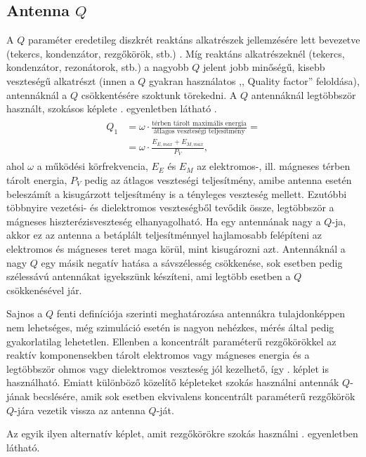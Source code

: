 		\subsection{Antenna $Q$}
		A $Q$ paraméter eredetileg diszkrét reaktáns alkatrészek jellemzésére lett bevezetve (tekercs, kondenzátor, rezgőkörök, stb.) \cite{story-of-q}. Míg reaktáns alkatrészeknél (tekercs, kondenzátor, rezonátorok, stb.) a nagyobb $Q$ jelent jobb minőségű, kisebb veszteségű alkatrészt (innen a $Q$ gyakran használatos ,, Quality factor'' feloldása), antennáknál a $Q$ csökkentésére szoktunk törekedni. A $Q$ antennáknál legtöbbször használt, szokásos képlete . egyenletben látható \cite{multi-band}.
		\begin{align}
			\begin{split}\label{equ:Q}
				Q_1 & = \omega \cdot \frac{\text{térben tárolt maximális energia}}{\text{átlagos veszteségi teljesítmény}} = \\
				& = \omega \cdot \frac{E_{E, max}+E_{M, max}}{P_V},
			\end{split}
		\end{align}
		ahol $\omega$ a működési körfrekvencia, $E_E$ és $E_M$ az elektromos-, ill. mágneses térben tárolt energia, $P_V$ pedig az átlagos veszteségi teljesítmény, amibe antenna esetén beleszámít a kisugárzott teljesítmény is a tényleges veszteség mellett. Ezutóbbi többnyire vezetési- és dielektromos veszteségből tevődik össze, legtöbbször a mágneses hiszterézisveszteség elhanyagolható. Ha egy antennának nagy a $Q$-ja, akkor ez az antenna a betáplált teljesítménnyel hajlamosabb felépíteni az elektromos és mágneses teret maga körül, mint kisugározni azt. Antennáknál a nagy $Q$ egy másik negatív hatása a sávszélesség csökkenése, sok esetben pedig szélessávú antennákat igyekszünk készíteni, ami legtöbb esetben a $Q$ csökkenésével jár.
		\par Sajnos a $Q$ fenti definíciója szerinti meghatározása antennákra tulajdonképpen nem lehetséges, még szimuláció esetén is nagyon nehézkes, mérés által pedig gyakorlatilag lehetetlen. Ellenben a koncentrált paraméterű rezgőkörökkel az reaktív komponensekben tárolt elektromos vagy mágneses energia és a legtöbbször ohmos vagy dielektromos veszteség jól kezelhető, így . képlet is használható. Emiatt különböző közelítő képleteket szokás használni antennák $Q$-jának becslésére, amik sok esetben ekvivalens koncentrált paraméterű rezgőkörök $Q$-jára vezetik vissza az antenna $Q$-ját.
		\par Az egyik ilyen alternatív képlet, amit rezgőkörökre szokás használni . egyenletben látható.
